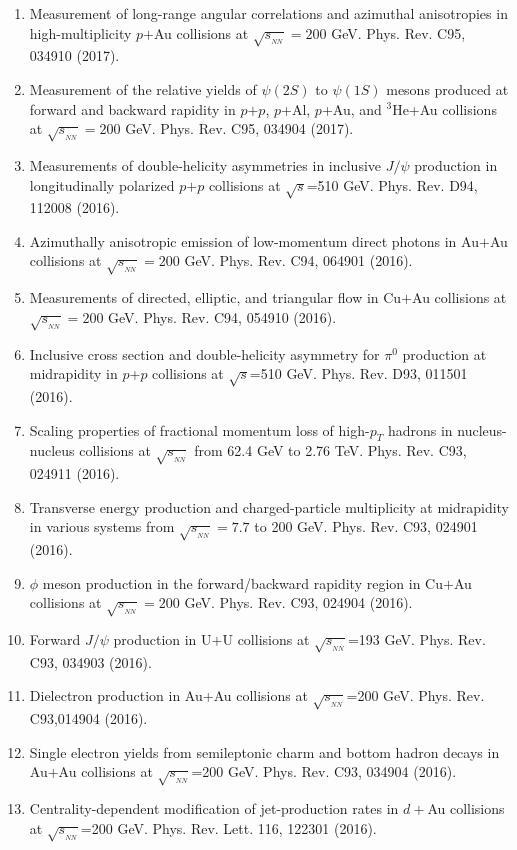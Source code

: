 \documentclass[11pt]{article}
\begin{document}
\begin{flushleft}
\begin{center}
\begin{enumerate}
	\item Measurement of long-range angular correlations and azimuthal anisotropies in high-multiplicity $p$$+$Au collisions at $\sqrt{s_{_{NN}}}=200$ GeV. Phys. Rev. C95, 034910 (2017).
	
	\item Measurement of the relative yields of $\psi(2S)$ to $\psi(1S)$ mesons produced at forward and backward rapidity in $p$$+$$p$, $p$+Al, $p$+Au, and $^3$He+Au collisions at $\sqrt{s_{_{NN}}}=200$ GeV. Phys. Rev. C95, 034904 (2017).
	
	\item Measurements of double-helicity asymmetries in inclusive $J/\psi$ production in longitudinally polarized $p$$+$$p$ collisions at $\sqrt{s}$=510 GeV. Phys. Rev. D94, 112008 (2016).
	\item	 Azimuthally anisotropic emission of low-momentum direct photons in Au$+$Au collisions at $\sqrt{s_{_{NN}}}=200$ GeV. Phys. Rev. C94, 064901 (2016).
	\item	Measurements of directed, elliptic, and triangular flow in Cu$+$Au collisions at $\sqrt{s_{_{NN}}}=200$ GeV. Phys. Rev. C94, 054910 (2016).
	\item Inclusive cross section and double-helicity asymmetry for $\pi^0$ production at midrapidity in $p$+$p$ collisions at $\sqrt{s}$=510 GeV. Phys. Rev. D93, 011501 (2016).	
	\item	 Scaling properties of fractional momentum loss of high-$p_T$ hadrons in nucleus-nucleus collisions at $\sqrt{s_{_{NN}}}$ from 62.4 GeV to 2.76 TeV. Phys. Rev. C93, 024911 (2016).	
	\item	 Transverse energy production and charged-particle multiplicity at midrapidity in various systems from $\sqrt{s_{_{NN}}}=7.7$ to 200 GeV. Phys. Rev. C93, 024901 (2016).
	\item  $\phi$ meson production in the forward/backward rapidity region in Cu$+$Au collisions at $\sqrt{s_{_{NN}}}=200$ GeV. Phys. Rev. C93, 024904 (2016).
	\item	 Forward $J/\psi$ production in U$+$U collisions at $\sqrt{s_{_{NN}}}$=193 GeV. Phys. Rev. C93, 034903 (2016).
	\item Dielectron production in Au+Au collisions at $\sqrt{s_{_{NN}}}$=200 GeV. Phys. Rev. C93,014904 (2016).  
	\item Single electron yields from semileptonic charm and bottom hadron decays in Au+Au collisions at $\sqrt{s_{_{NN}}}$=200 GeV. Phys. Rev. C93, 034904 (2016).
	\item Centrality-dependent modification of jet-production rates in $d+$Au collisions at $\sqrt{s_{_{NN}}}$=200 GeV. Phys. Rev. Lett. 116, 122301 (2016).

\end{enumerate}
\end{center}
\end{flushleft}
\end{document}
